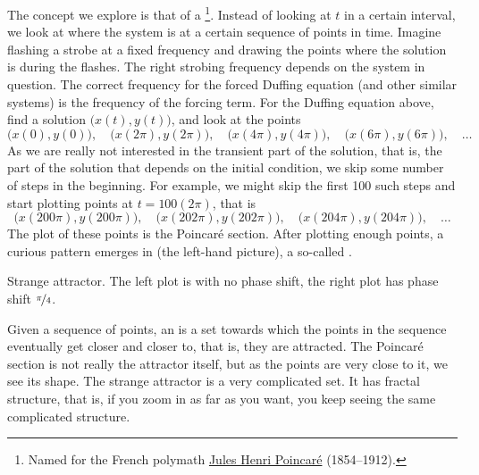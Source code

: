 \documentclass{ximera}
\begin{document}
The concept we explore is that of a \emph{}%
\footnote{Named for the French polymath \href{https://en.wikipedia.org/wiki/Henri_Poincar\%C3\%A9}{Jules Henri Poincar\'e} (1854--1912).}.
Instead of looking at $t$ in a certain interval, we look at where the system is at a certain sequence of points in time. Imagine flashing a strobe at a fixed frequency and drawing the points where the solution is during the flashes. The right strobing frequency depends on the system in question. The correct frequency for the forced Duffing equation (and other similar systems) is the frequency of the forcing term. For the Duffing equation above, find a solution $\bigl(x(t),y(t)\bigr)$, and look at the points
\begin{equation*}
    \bigl(x(0),y(0)\bigr), \quad \bigl(x(2\pi),y(2\pi)\bigr), \quad \bigl(x(4\pi),y(4\pi)\bigr), \quad \bigl(x(6\pi),y(6\pi)\bigr), \quad \ldots
\end{equation*}
As we are really not interested in the transient part of the solution, that is, the part of the solution that depends on the initial condition, we skip some number of steps in the beginning.  For example, we might skip the first 100 such steps and start plotting points at $t = 100(2\pi)$, that is
\begin{equation*}
    \bigl(x(200\pi),y(200\pi)\bigr), \quad \bigl(x(202\pi),y(202\pi)\bigr), \quad \bigl(x(204\pi),y(204\pi)\bigr), \quad \ldots
\end{equation*}
The plot of these points is the Poincar\'e section. After plotting enough points, a curious pattern emerges in  (the left-hand picture), a so-called \emph{}.

\begin{myfig}
    \capstart
    \caption{Strange attractor.  The left plot is with no phase shift, the right plot has phase shift $\nicefrac{\pi}{4}$. \label{nlin:strange}}
\end{myfig}

Given a sequence of points, an \emph{} is a set towards which the points in the sequence eventually get closer and closer to, that is, they are attracted.  The Poincar\'e section is not really the attractor itself, but as the points are very close to it, we see its shape.  The strange attractor is a very complicated set.   It has fractal structure, that is, if you zoom in as far as you want, you keep seeing the same complicated structure.
\end{document}
